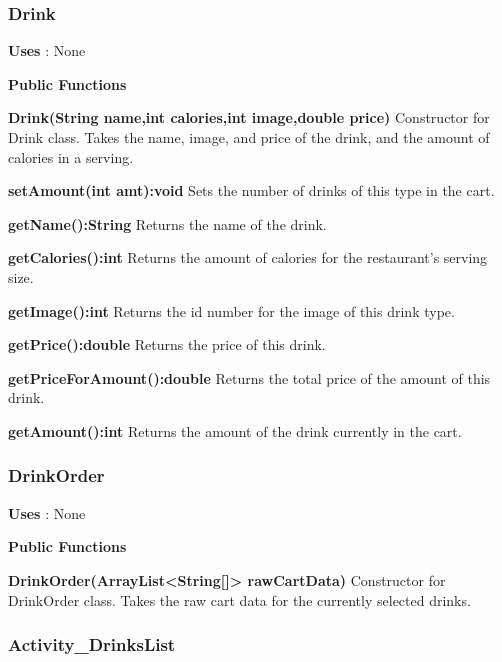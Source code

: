 \documentclass [10pt]{article}
\begin{document}

\subsubsection{Drink}

\textbf{Uses} : None

\textbf{Public Functions}

\textbf{Drink(String name,int calories,int image,double price)}
Constructor for Drink class. Takes the name, image, and price of the drink, and the amount of calories in a serving.

\textbf{setAmount(int amt):void}
Sets the number of drinks of this type in the cart.

\textbf{getName():String}
Returns the name of the drink.

\textbf{getCalories():int}
Returns the amount of calories for the restaurant's serving size.

\textbf{getImage():int}
Returns the id number for the image of this drink type.

\textbf{getPrice():double}
Returns the price of this drink.

\textbf{getPriceForAmount():double}
Returns the total price of the amount of this drink.

\textbf{getAmount():int}
Returns the amount of the drink currently in the cart.


\subsubsection{DrinkOrder}

\textbf{Uses} : None

\textbf{Public Functions}

\textbf{DrinkOrder(ArrayList<String[]> rawCartData)}
Constructor for DrinkOrder class. Takes the raw cart data for the currently selected drinks.


\pagebreak 



\subsubsection{Activity\_DrinksList}
\end{document}
